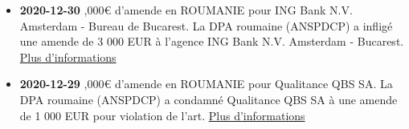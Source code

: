 \documentclass[french]{article}
\begin{document}
\newpage
\justify
	\begin{multicols}{2}
		\begin{itemize}
			\item \textbf{2020-12-30} ,000€ d'amende en ROUMANIE pour ING Bank N.V. Amsterdam - Bureau de Bucarest.
			\newline
			La DPA roumaine (ANSPDCP) a infligé une amende de 3 000 EUR à l'agence ING Bank N.V. Amsterdam - Bucarest.
			\newline
			\href{https://www.dataprotection.ro/?page=Comunicat_presa_30_12_2020&lang=ro}{Plus d'informations}
			\vspace{1cm}
	
			\item \textbf{2020-12-29} ,000€ d'amende en ROUMANIE pour Qualitance QBS SA.
			\newline
			La DPA roumaine (ANSPDCP) a condamné Qualitance QBS SA à une amende de 1 000 EUR pour violation de l'art.
			\newline
			\href{https://www.dataprotection.ro/?page=Comunicat_Presa_29_12_2020&lang=ro}{Plus d'informations}
			\vspace{1cm}
	

\end{itemize}
\end{multicols}
\end{document}

